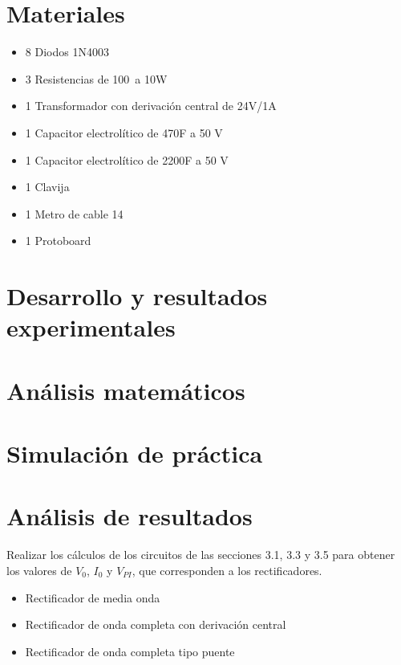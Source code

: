 \documentclass[12pt]{article}
\begin{document}
        \section*{Materiales}
        \label{sec:materiales}
        \begin{itemize}
            \item [] 8 \qquad Diodos 1N4003
            \item [] 3 \qquad Resistencias de 100\textOmega\ a 10W
            \item [] 1 \qquad Transformador con derivación central de 24V/1A
            \item [] 1 \qquad Capacitor electrolítico de 470\textmu F a 50 V
            \item [] 1 \qquad Capacitor electrolítico de 2200\textmu F a 50 V
            \item [] 1 \qquad Clavija
            \item [] 1 \qquad Metro de cable 14
            \item [] 1 \qquad Protoboard
        \end{itemize}
        
        
        \section*{Desarrollo y resultados experimentales}
        \label{sec:desarrollo}

        \section*{Análisis matemáticos}
        \label{sec:calculos}

        \section*{Simulación de práctica}
        \label{sec:simulador}

        \section*{Análisis de resultados}
        \label{sec:resultados}
        Realizar los cálculos de los circuitos de las secciones 3.1, 3.3 y 3.5 para obtener los valores de $V_0$,
        $I_0$ y $V_{PI}$, que corresponden a los rectificadores.\par
        \begin{itemize}
            \item Rectificador de media onda
            \item Rectificador de onda completa con derivación central
            \item Rectificador de onda completa tipo puente
        \end{itemize}
\end{document}
